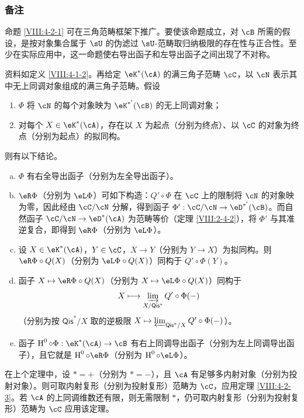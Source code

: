 \subsubsection{备注}\label{VIII:4-2-2}
命题 \ref{VIII:4-2-1} 可在三角范畴框架下推广。要使该命题成立，对 $\cB$ 所需的假设，是按对象集合属于 $\sU$ 的伪滤过 $\sU$-范畴取归纳极限的存在性与正合性。至少在实际应用中，这一命题使右导出函子和左导出函子之间出现了不对称。
\setcounter{subsubsection}{1}
\begin{theorem}\label{VIII:4-2-3}
资料如定义 \ref{VIII:4-1-2}。再给定 $\eK^\ast(\cA)$ 的满三角子范畴 $\cC$，以 $\cN$ 表示其中无上同调对象组成的满三角子范畴。假设
\begin{enumerate}[(1)]
\item $\Phi$ 将 $\cN$ 的每个对象映为 $\eK^{\ast'}(\cB)$ 的无上同调对象；
\item 对每个 $X\in\eK^\ast(\cA)$，存在以 $X$ 为起点（分别为终点）、以 $\cC$ 的对象为终点（分别为起点）的拟同构。
\end{enumerate}
则有以下结论。
\begin{enumerate}[a)]
\item $\Phi$ 有右全导出函子（分别为左全导出函子）。
\item $\eR\Phi$（分别为 $\eL\Phi$）可如下构造：$Q'\circ\Phi$ 在 $\cC$ 上的限制将 $\cN$ 的对象映为零，因此经由 $\cC/\cN$ 分解，得到函子 $\Phi':\cC/\cN\to\eD^{\ast'}(\cB)$。而自然函子 $\cC/\cN\to\eD^\ast(\cA)$ 为范畴等价（定理 \ref{VIII:2-4-2}），将 $\Phi'$ 与其准逆复合，即得到 $\eR\Phi$（分别为 $\eL\Phi$）。
\item 设 $X\in\eK^\ast(\cA)$，$Y\in\cC$，$X\to Y$（分别为 $Y\to X$）为拟同构。则 $\eR\Phi\circ Q(X)$（分别为 $\eL\Phi\circ Q(X)$）同构于 $Q'\circ\Phi(Y)$。
\item 函子 $X\mapsto\eR\Phi\circ Q(X)$（分别为 $X\mapsto\eL\Phi\circ Q(X)$）同构于
\[
 X\longmapsto\varinjlim_{X/\mathsf{Qis}^\ast}Q'\circ\Phi(-)
\]
（分别为按 $\mathsf{Qis}^\ast/X$ 取的逆极限
$X\mapsto\varprojlim_{\mathsf{Qis}^\ast/X}Q'\circ\Phi(-)$）。
\item 函子 $\h^0\circ\Phi:\eK^\ast(\cA)\to\cB$ 有右上同调导出函子（分别为左上同调导出函子），且它就是 $\h^0\circ\eR\Phi$（分别为 $\h^0\circ\eL\Phi$）。
\end{enumerate}
\end{theorem}
\begin{derivedcorollary}\label{VIII:4-2-3-1}
在上个定理中，设 $\ast=+$（分别为 $\ast=-$），且 $\cA$ 有足够多内射对象（分别为投射对象）。则可取内射复形（分别为投射复形）范畴为 $\cC$，应用定理 \ref{VIII:4-2-3}。若 $\cA$ 的上同调维数还有限，则无需限制 $\ast$，仍可取内射复形（分别为投射复形）范畴为 $\cC$ 应用该定理。
\end{derivedcorollary}
